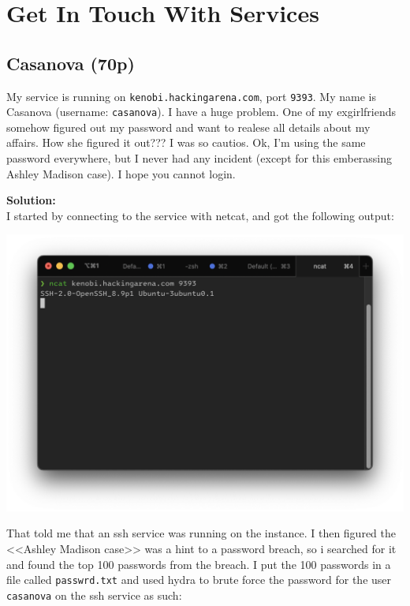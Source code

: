 \section{Get In Touch With Services}

\subsection{Casanova (70p)}
My service is running on \texttt{kenobi.hackingarena.com}, port \texttt{9393}. My name is Casanova (username: \texttt{casanova}). I have a huge problem. One of my exgirlfriends somehow figured out my password and want to realese all details about my affairs. How she figured it out??? I was so cautios. Ok, I'm using the same password everywhere, but I never had any incident (except for this emberassing Ashley Madison case). I hope you cannot login.

\textbf{Solution:}\\
I started by connecting to the service with netcat, and got the following output:

\begin{center}
    \includegraphics[width=15cm]{img/Get in touch with services/Casanova/Skjermbilde 2023-10-27 kl. 09.04.00.png}
\end{center}

That told me that an ssh service was running on the instance. I then figured the <<Ashley Madison case>> was a hint to a password breach, so i searched for it and found the top 100 passwords from the breach. I put the 100 passwords in a file called \texttt{passwrd.txt} and used hydra to brute force the password for the user \texttt{casanova} on the ssh service as such:

